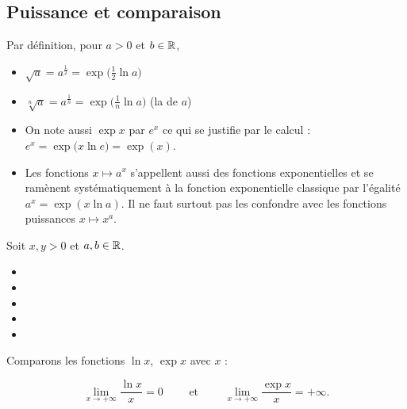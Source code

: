 \documentclass[class=report,crop=false]{standalone}
\begin{document}
\subsection{Puissance et comparaison}

Par définition, pour $a>0$ et $b\in \mathbb{R}$,

\begin{remarque*}
\sauteligne
\begin{itemize}
  \item $\sqrt a = a^\frac12 = \exp\big( \frac12 \ln a\big)$
  \item $\sqrt[n] a = a^\frac1n = \exp\big( \frac1n \ln a\big)$ (la  de $a$)
  \item On note aussi $\exp x$ par $e^x$ ce qui se justifie par le calcul :
$e^x =  \exp\big(x \ln e \big) = \exp(x)$.
  \item Les fonctions $x \mapsto a^x$ s'appellent aussi des fonctions exponentielles et
se ramènent systématiquement à la fonction exponentielle classique
par l'égalité $a^x = \exp(x \ln a)$. Il ne faut surtout pas les confondre avec les fonctions puissances
$x \mapsto x^a$.
\end{itemize}
\end{remarque*}


\begin{proposition}
Soit $x,y >0$ et $a,b\in \mathbb{R}$.
\begin{itemize}
  \item {}
  \item {}
  \item {}
  \item {}
  \item {}  
\end{itemize}

\end{proposition}


Comparons les fonctions $\ln x$, $\exp x$ avec $x$ :
\begin{proposition}
$$\lim_{x\to +\infty} \frac{\ln x}{x} = 0 \qquad \text{ et }  \qquad
\lim_{x\to +\infty} \frac{\exp x}{x} = +\infty.$$
\end{proposition}


\end{document}
